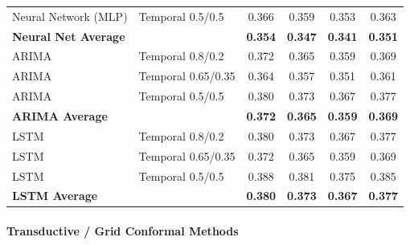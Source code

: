 \documentclass[11pt,a4paper]{article}
\begin{document}
\begin{table}[H]
\begin{tabular}{llcccc}
Neural Network (MLP) & Temporal 0.5/0.5 & 0.366 & 0.359 & 0.353 & 0.363 \\
\textbf{Neural Net Average} & & \textbf{0.354} & \textbf{0.347} & \textbf{0.341} & \textbf{0.351} \\
\midrule
ARIMA & Temporal 0.8/0.2 & 0.372 & 0.365 & 0.359 & 0.369 \\
ARIMA & Temporal 0.65/0.35 & 0.364 & 0.357 & 0.351 & 0.361 \\
ARIMA & Temporal 0.5/0.5 & 0.380 & 0.373 & 0.367 & 0.377 \\
\textbf{ARIMA Average} & & \textbf{0.372} & \textbf{0.365} & \textbf{0.359} & \textbf{0.369} \\
\midrule
LSTM & Temporal 0.8/0.2 & 0.380 & 0.373 & 0.367 & 0.377 \\
LSTM & Temporal 0.65/0.35 & 0.372 & 0.365 & 0.359 & 0.369 \\
LSTM & Temporal 0.5/0.5 & 0.388 & 0.381 & 0.375 & 0.385 \\
\textbf{LSTM Average} & & \textbf{0.380} & \textbf{0.373} & \textbf{0.367} & \textbf{0.377} \\
\bottomrule
\end{tabular}
\end{table}

\paragraph{Transductive / Grid Conformal Methods}
\end{document}
